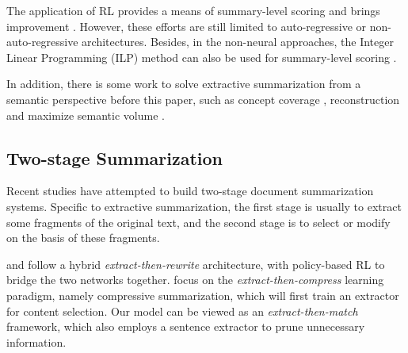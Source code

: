 \documentclass[11pt,a4paper]{article}
\begin{document}
The application of RL provides a means of summary-level scoring and brings improvement \cite{narayan2018ranking, bae2019summary}. However, these efforts are still limited to auto-regressive or non-auto-regressive architectures. Besides, in the non-neural approaches, the Integer Linear Programming (ILP) method can also be used for summary-level scoring \cite{wan2015multi}.

In addition, there is some work to solve extractive summarization from a semantic perspective before this paper, such as concept coverage \cite{gillick2009scalable}, reconstruction \cite{miao2016language} and maximize semantic volume \cite{yogatama2015extractive}.


















\subsection{Two-stage Summarization}
Recent studies \cite{alyguliyev2009two, galanis2010extractive, zhang2019pretraining} have attempted to build two-stage document summarization systems. Specific to extractive summarization, the first stage is usually to extract some fragments of the original text, and the second stage is to select or modify on the basis of these fragments.







\citet{chen2018fast} and \citet{bae2019summary} follow a hybrid \textit{extract-then-rewrite} architecture, with policy-based RL to bridge the two networks together.
\citet{lebanoff2019scoring,xu-durrett-2019-neural,mendes2019jointly} focus on the \textit{extract-then-compress} learning paradigm, namely compressive summarization, which will first train an extractor for content selection.
Our model can be viewed as an \textit{extract-then-match} framework, which also employs a  sentence extractor to prune unnecessary information.
\end{document}
